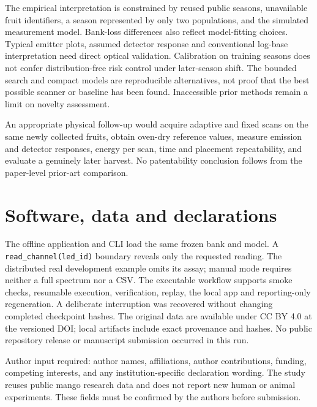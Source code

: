 \documentclass[11pt,a4paper]{article}
\begin{document}
The empirical interpretation is constrained by reused public seasons, unavailable fruit identifiers, a season represented by only two populations, and the simulated measurement model. Bank-loss differences also reflect model-fitting choices. Typical emitter plots, assumed detector response and conventional log-base interpretation need direct optical validation. Calibration on training seasons does not confer distribution-free risk control under later-season shift. The bounded search and compact models are reproducible alternatives, not proof that the best possible scanner or baseline has been found. Inaccessible prior methods remain a limit on novelty assessment.

An appropriate physical follow-up would acquire adaptive and fixed scans on the same newly collected fruits, obtain oven-dry reference values, measure emission and detector responses, energy per scan, time and placement repeatability, and evaluate a genuinely later harvest. No patentability conclusion follows from the paper-level prior-art comparison.

\section{Software, data and declarations}
The offline application and CLI load the same frozen bank and model. A \texttt{read\_channel(led\_id)} boundary reveals only the requested reading. The distributed real development example omits its assay; manual mode requires neither a full spectrum nor a CSV. The executable workflow supports smoke checks, resumable execution, verification, replay, the local app and reporting-only regeneration. A deliberate interruption was recovered without changing completed checkpoint hashes. The original data are available under CC BY 4.0 at the versioned DOI; local artifacts include exact provenance and hashes. No public repository release or manuscript submission occurred in this run.

Author input required: author names, affiliations, author contributions, funding, competing interests, and any institution-specific declaration wording. The study reuses public mango research data and does not report new human or animal experiments. These fields must be confirmed by the authors before submission.

\clearpage


\end{document}
